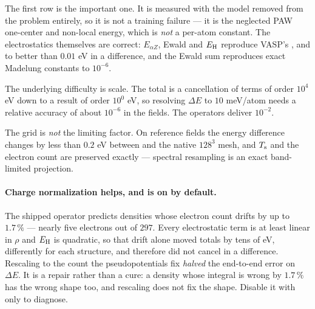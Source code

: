The first row is the important one. It is measured with the model removed from
the problem entirely, so it is not a training failure --- it is the neglected
PAW one-center and non-local energy, which is \emph{not} a per-atom constant.
The electrostatics themselves are correct: $E_{\alpha Z}$, Ewald and
$E_{\rm H}$ reproduce VASP's ,  and  to better
than $0.01$ eV in a difference, and the Ewald sum reproduces exact Madelung
constants to $10^{-6}$.

The underlying difficulty is scale. The total is a cancellation of terms of
order $10^{4}$ eV down to a result of order $10^{0}$ eV, so resolving $\Delta E$
to $10$ meV/atom needs a relative accuracy of about $10^{-6}$ in the fields.
The operators deliver $10^{-2}$.

\begin{pnote}
The grid is \emph{not} the limiting factor. On reference fields the energy
difference changes by less than $0.2$ eV between  and the
native $128^{3}$ mesh, and $T_{\mathrm{s}}$ and the electron count are preserved exactly
--- spectral resampling is an exact band-limited projection.
\end{pnote}

\paragraph{Charge normalization helps, and is on by default.} The shipped
 operator predicts densities whose electron count drifts by up to
$1.7\,\%$ --- nearly five electrons out of $297$. Every electrostatic term is
at least linear in $\rho$ and $E_{\rm H}$ is quadratic, so that drift alone
moved totals by tens of eV, differently for each structure, and therefore did
not cancel in a difference. Rescaling to the count the pseudopotentials fix
\emph{halved} the end-to-end error on $\Delta E$. It is a repair rather than a
cure: a density whose integral is wrong by $1.7\,\%$ has the wrong shape too,
and rescaling does not fix the shape. Disable it with
 only to diagnose.
